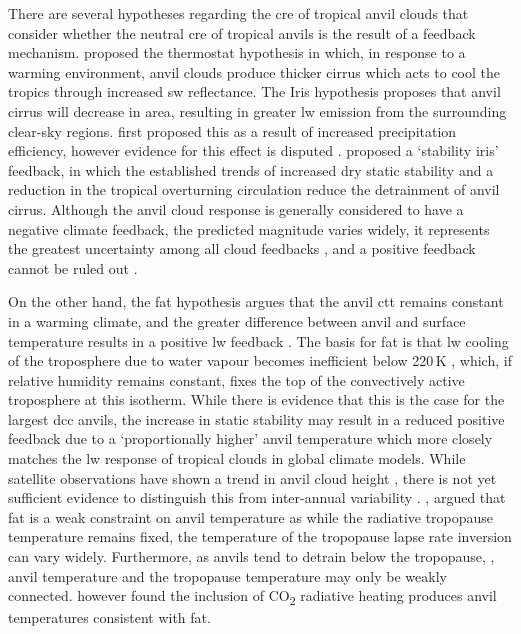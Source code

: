 \documentclass[acp, manuscript]{copernicus}
\begin{document}
There are several hypotheses regarding the \acrshort{cre} of tropical anvil clouds that consider whether the neutral \acrshort{cre} of tropical anvils is the result of a feedback mechanism. 
\citet{ramanathan_cloudradiative_1989} proposed the thermostat hypothesis in which, in response to a warming environment, anvil clouds produce thicker cirrus which acts to cool the tropics through increased \acrshort{sw} reflectance. 
The Iris hypothesis proposes that anvil cirrus will decrease in area, resulting in greater \acrshort{lw} emission from the surrounding clear-sky regions.
\citet{lindzen_does_2001} first proposed this as a result of increased precipitation efficiency, however evidence for this effect is disputed \citep{delgenio_climatic_2002, lin_examination_2004}.
\citet{bony_thermodynamic_2016} proposed a `stability iris' feedback, in which the established trends of increased dry static stability \citep{held_robust_2006} and a reduction in the tropical overturning circulation \citep{vecchi_global_2007} reduce the detrainment of anvil cirrus.
Although the anvil cloud response is generally considered to have a negative climate feedback, the predicted magnitude varies widely, it represents the greatest uncertainty among all cloud feedbacks \citep{sherwood_assessment_2020}, and a positive feedback cannot be ruled out \citep{gasparini_opinion_2023b}.

On the other hand, the \acrfull{fat} hypothesis argues that the anvil \acrfull{ctt} remains constant in a warming climate, and the greater difference between anvil and surface temperature results in a positive \acrshort{lw} feedback \citep{hartmann_important_2002}.
The basis for \acrshort{fat} is that \acrshort{lw} cooling of the troposphere due to water vapour becomes inefficient below 220\,\unit{K} \citep{jeevanjee_simple_2020}, which, if relative humidity remains constant, fixes the top of the convectively active troposphere at this isotherm. 
While there is evidence that this is the case for the largest \acrshort{dcc} anvils, the increase in static stability may result in a reduced positive feedback due to a `proportionally higher' anvil temperature \citep{zelinka_why_2010} which more closely matches the \acrshort{lw} response of tropical clouds in global climate models.
While satellite observations have shown a trend in anvil cloud height \citep{norris_evidence_2016}, there is not yet sufficient evidence to distinguish this from inter-annual variability \citep{takahashi_when_2019}.
\citet{seeley_fat_2019}, argued that \acrshort{fat} is a weak constraint on anvil temperature as while the radiative tropopause temperature remains fixed, the temperature of the tropopause lapse rate inversion can vary widely. 
Furthermore, as anvils tend to detrain below the tropopause, \citep{takahashi_level_2017, wang_observational_2020}, anvil temperature and the tropopause temperature may only be weakly connected.
\citet{seidel_temperatures_2022} however found the inclusion of CO\textsubscript{2} radiative heating produces anvil temperatures consistent with \acrshort{fat}.
\end{document}
